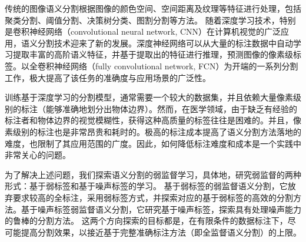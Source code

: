 传统的图像语义分割根据图像的颜色空间、空间距离及纹理等特征进行处理，包括聚类分割\citep{coates2012learning}、阈值分割\citep{ying2005fast}、决策树分类\citep{shotton2008semantic}、图割分割\citep{vicente2008graph}等方法。
随着深度学习技术，特别是卷积神经网络（convolutional neural network, CNN）在计算机视觉的广泛应用，语义分割技术迎来了新的发展。深度神经网络可以从大量的标注数据中自动学习提取丰富的高阶语义特征，并基于提取出的特征进行推理，预测图像的像素级标签。以全卷积神经网络（fully convolutional network, FCN）为开端的一系列分割工作，极大提高了该任务的准确度与应用场景的广泛性。

训练基于深度学习的分割模型，通常需要一个较大的数据集，并且依赖大量像素级别的标注（能够准确地划分出物体边界）。然而，在医学领域，由于缺乏有经验的标注者和物体边界的视觉模糊性，获得这种高质量的标签往往是困难的。并且，像素级别的标注也是非常昂贵和耗时的。极高的标注成本提高了语义分割方法落地的难度，也限制了其应用范围的广度。因此，如何降低标注难度和成本是一个实践中非常关心的问题。

为了解决上述问题，我们探索语义分割的弱监督学习，具体地，研究弱监督的两种形式：基于弱标签和基于噪声标签的学习。
基于弱标签的弱监督语义分割\citep{papandreou2015weakly,rajchl2016deepcut,cai2018accurate,ji2019scribble,kervadec2020bounding}，它放弃要求较高的全标注，采用弱标签方式，并探索对应的基于弱标签的高效的分割方法。基于噪声标签弱监督语义分割\citep{Zhu2019PickandLearnAQ,Xue2020CascadedRL,Zhang2020RobustMI}，它研究基于噪声标签，探索具有处理噪声能力的鲁棒的分割方法。
这两个方向探索的目标都是，在有限条件的数据标注下，尽可能提高分割效果，以接近基于完整准确标注方法（即全监督语义分割）的上限。

